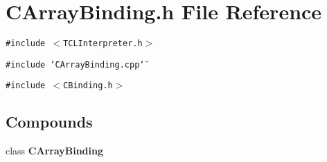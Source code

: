 \section{CArray\-Binding.h File Reference}
\label{CArrayBinding_8h}
{\tt \#include $<$TCLInterpreter.h$>$}\par
{\tt \#include \char`\"{}CArray\-Binding.cpp\char`\"{}}\par
{\tt \#include $<$CBinding.h$>$}\par
\subsection*{Compounds}
\begin{CompactItemize}
\item 
class {\bf CArray\-Binding}
\end{CompactItemize}
